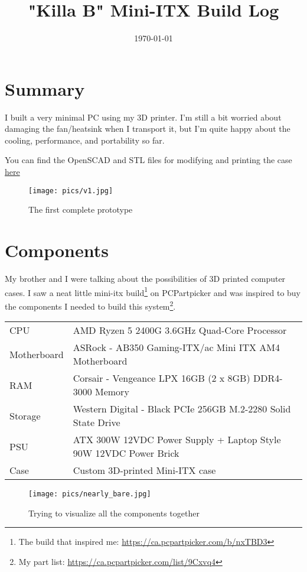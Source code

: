 \documentclass{article}
\title{\textbf{"Killa B" Mini-ITX Build Log}}
\author{}
\date{\today}
\begin{document}
\maketitle

\section{Summary}
I built a very minimal PC using my 3D printer. I'm still a bit worried about damaging the fan/heatsink when I transport it, but I'm quite happy about the cooling, performance, and portability so far.

You can find the OpenSCAD and STL files for modifying and printing the case \href{https://thingiverse.com/thing:2966093}{here}

\begin{figure}[h]
\texttt{[image: pics/v1.jpg]}
\caption{The first complete prototype}
\end{figure}

\section{Components}
My brother and I were talking about the possibilities of 3D printed computer cases. I saw a neat little mini-itx build\footnote{The build that inspired me: \url{https://ca.pcpartpicker.com/b/nxTBD3}} on PCPartpicker and was inspired to buy the components I needed to build this system\footnote{My part list: \url{https://ca.pcpartpicker.com/list/9Cxvq4}}.
\begin{center}
\begin{tabular}{ l l }
 CPU & AMD Ryzen 5 2400G 3.6GHz Quad-Core Processor \\  
 Motherboard & ASRock - AB350 Gaming-ITX/ac Mini ITX AM4 Motherboard \\  
 RAM & Corsair - Vengeance LPX 16GB (2 x 8GB) DDR4-3000 Memory \\
 Storage & Western Digital - Black PCIe 256GB M.2-2280 Solid State Drive \\
 PSU & ATX 300W 12VDC Power Supply + Laptop Style 90W 12VDC Power Brick \\
 Case & Custom 3D-printed  Mini-ITX case \\
\end{tabular}
\end{center}

\begin{figure}[h]
\texttt{[image: pics/nearly\_bare.jpg]}
\caption{Trying to visualize all the components together}
\end{figure}
\end{document}
